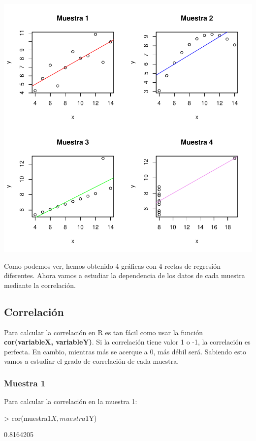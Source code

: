 \documentclass[a4paper]{article}
\begin{document}
\includegraphics{practica-3-019}

Como podemos ver, hemos obtenido 4 gráficas con 4 rectas de regresión diferentes. Ahora vamos a estudiar la dependencia de los datos de cada muestra mediante la correlación.

\subsection{Correlación} Para calcular la correlación en R es tan fácil como usar la función \textbf{cor(variableX, variableY)}. Si la correlación tiene valor 1 o -1, la correlación es perfecta. En cambio, mientras más se acerque a 0, más débil será. Sabiendo esto vamos a estudiar el grado de correlación de cada muestra.

\subsubsection{Muestra 1} Para calcular la correlación en la muestra 1:
\begin{Schunk}
\begin{Sinput}
> cor(muestra1$X,muestra1$Y)
\end{Sinput}
\begin{Soutput}
[1] 0.8164205
\end{Soutput}
\end{Schunk}
\end{document}
